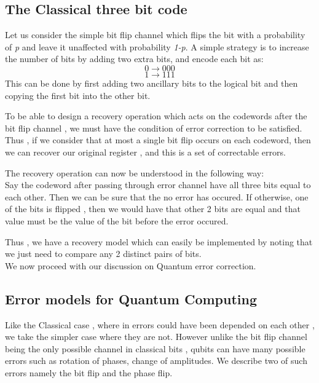 \subsection{The Classical three bit code}
Let us consider the simple bit flip channel which flips the bit with a probability of \textit{p} and leave it unaffected with probability \textit{1-p}. A simple strategy is to increase the number of bits by adding two extra bits, and encode each bit as:
$$0 \to 000$$
$$1 \to 111$$
This can be done by first adding two ancillary bits to the logical bit and then copying the first bit into the other bit.\par
To be able to design a recovery operation which acts on the codewords after the bit flip channel , we must have the condition of error correction to be satisfied. Thus , if we consider that at most a single bit flip occurs on each codeword, then we can recover our original register , and this is a set of correctable errors.\par
The recovery operation can now be understood in the following way:\\
Say the codeword after passing through error channel have all three bits equal to each other. Then we can be sure that the no error has occured. If otherwise, one of the bits is flipped , then we would have that other 2 bits are equal and that value must be the value of the bit before the error occured.\par
Thus , we have a recovery model which can easily be implemented by noting that we just need to compare any 2 distinct pairs of bits.
\\We now proceed with our discussion on Quantum error correction.
\subsection{Error models for Quantum Computing}
Like the Classical case , where in errors could have been depended on each other , we take the simpler case where they are not. However unlike the bit flip channel being the only possible channel in classical bits , qubits can have many possible errors such as rotation of phases, change of amplitudes. We describe two of such errors namely the bit flip and the phase flip.
\\
